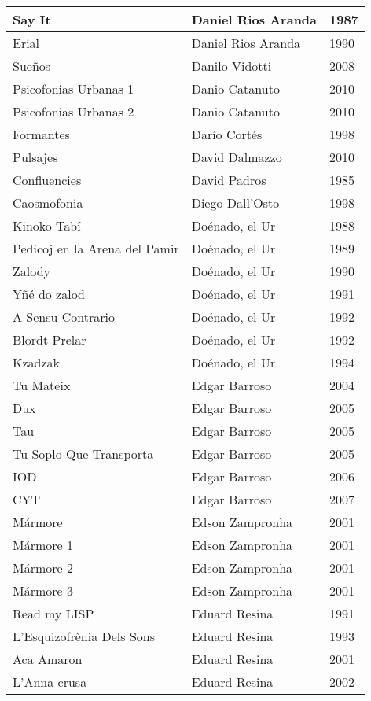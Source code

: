 \begin{center}
\begin{longtable}{| p{} | p{} | p{} |}
Say It & Daniel Rios Aranda & 1987 \\ \hline 
Erial & Daniel Rios Aranda & 1990 \\ \hline 
Sueños & Danilo Vidotti & 2008 \\ \hline 
Psicofonias Urbanas 1 & Danio Catanuto & 2010 \\ \hline 
Psicofonias Urbanas 2 & Danio Catanuto & 2010 \\ \hline 
Formantes & Darío Cortés & 1998 \\ \hline 
Pulsajes & David Dalmazzo & 2010 \\ \hline 
Confluencies & David Padros & 1985 \\ \hline 
Caosmofonia & Diego Dall'Osto & 1998 \\ \hline 
Kinoko Tabí & Doénado, el Ur & 1988 \\ \hline 
Pedicoj en la Arena del Pamir & Doénado, el Ur & 1989 \\ \hline 
Zalody & Doénado, el Ur & 1990 \\ \hline 
Yñé do zalod & Doénado, el Ur & 1991 \\ \hline 
A Sensu Contrario & Doénado, el Ur & 1992 \\ \hline 
Blordt Prelar & Doénado, el Ur & 1992 \\ \hline 
Kzadzak & Doénado, el Ur & 1994 \\ \hline 
Tu Mateix & Edgar Barroso & 2004 \\ \hline 
Dux & Edgar Barroso & 2005 \\ \hline 
Tau & Edgar Barroso & 2005 \\ \hline 
Tu Soplo Que Transporta & Edgar Barroso & 2005 \\ \hline 
IOD & Edgar Barroso & 2006 \\ \hline 
CYT & Edgar Barroso & 2007 \\ \hline 
Mármore & Edson Zampronha & 2001 \\ \hline 
Mármore 1 & Edson Zampronha & 2001 \\ \hline 
Mármore 2 & Edson Zampronha & 2001 \\ \hline 
Mármore 3 & Edson Zampronha & 2001 \\ \hline 
Read my LISP & Eduard Resina & 1991 \\ \hline 
L'Esquizofrènia Dels Sons & Eduard Resina & 1993 \\ \hline 
Aca Amaron & Eduard Resina & 2001 \\ \hline 
L'Anna-crusa & Eduard Resina & 2002 \\ \hline 

\end{longtable}
\end{center}
